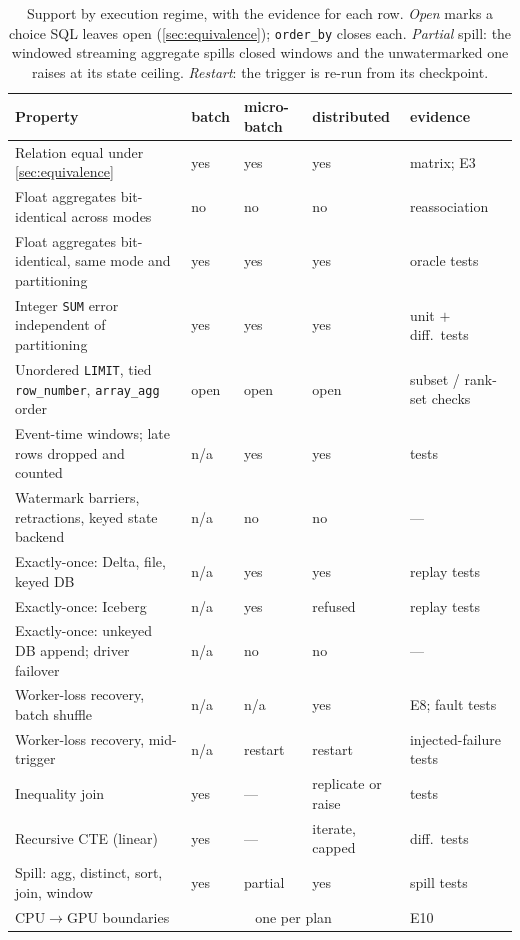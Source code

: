 \documentclass[10pt,twocolumn,letterpaper]{article}   %
\newcommand{\E}[1]{\textsf{E#1}}
\begin{document}
\begin{table}[tb]
\centering\scriptsize
\setlength{\tabcolsep}{2.2pt}
\begin{tabular}{@{}>{\raggedright\arraybackslash}p{}lll>{\raggedright\arraybackslash}p{}@{}}
\toprule
Property & batch & micro-batch & distributed & evidence \\
\midrule
Relation equal under \cref{sec:equivalence} & yes & yes & yes & matrix; \E{3} \\
Float aggregates bit-identical across modes & no & no & no & reassociation \\
Float aggregates bit-identical, same mode and partitioning & yes & yes & yes & oracle tests \\
Integer \texttt{SUM} error independent of partitioning & yes & yes & yes & unit $+$ diff.\ tests \\
Unordered \texttt{LIMIT}, tied \texttt{row\_number}, \texttt{array\_agg} order & open & open & open & subset / rank-set checks \\
\midrule
Event-time windows; late rows dropped and counted & n/a & yes & yes & tests \\
Watermark barriers, retractions, keyed state backend & n/a & no & no & --- \\
Exactly-once: Delta, file, keyed DB & n/a & yes & yes & replay tests \\
Exactly-once: Iceberg & n/a & yes & refused & replay tests \\
Exactly-once: unkeyed DB append; driver failover & n/a & no & no & --- \\
\midrule
Worker-loss recovery, batch shuffle & n/a & n/a & yes & \E{8}; fault tests \\
Worker-loss recovery, mid-trigger & n/a & restart & restart & injected-failure tests \\
Inequality join & yes & --- & replicate or raise & tests \\
Recursive CTE (linear) & yes & --- & iterate, capped & diff.\ tests \\
Spill: agg, distinct, sort, join, window & yes & partial & yes & spill tests \\
CPU$\rightarrow$GPU boundaries & \multicolumn{3}{c}{one per plan} & \E{10} \\
\bottomrule
\end{tabular}
\caption{Support by execution regime, with the evidence for each row. \emph{Open} marks a choice
SQL leaves open (\cref{sec:equivalence}); \texttt{order\_by} closes each. \emph{Partial} spill:
the windowed streaming aggregate spills closed windows and the unwatermarked one raises at its
state ceiling. \emph{Restart}: the trigger is re-run from its checkpoint.}
\label{tab:matrix}
\end{table}
\end{document}
